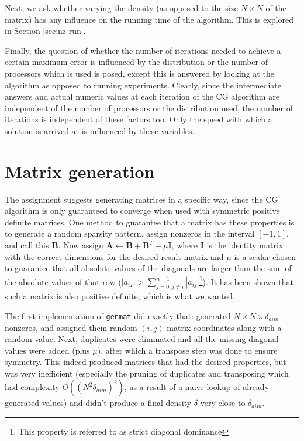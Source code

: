 \documentclass[a4paper]{article}
\newcommand{\mat}[1]{\ensuremath{\boldsymbol{#1}}}
\begin{document}
Next, we ask whether varying the density (as opposed to the size $N\times N$ of the matrix) has
any influence on the running time of the algorithm. This is explored in Section \ref{sec:nz-run}.

Finally, the question of whether the number of iterations needed to achieve a certain maximum
error is influenced by the distribution or the number of processors which is used is posed, except
this is answered by looking at the algorithm as opposed to running experiments. Clearly, since the
intermediate answers and actual numeric values at each iteration of the CG algorithm are independent
of the number of processors or the distribution used, the number of iterations is independent of these
factors too. Only the speed with which a solution is arrived at is influenced by these variables.

\section{Matrix generation}\label{sec:matrix-generation}

The assignment suggests generating matrices in a specific way, since the CG
algorithm is only guaranteed to converge when used with symmetric positive
definite matrices. One method to guarantee that a matrix has these properties
is to generate a random sparsity pattern, assign nonzeros in the interval
$[-1,1]$, and call this \mat B.  Now assign $\mat A \leftarrow \mat B + \mat
B^T + \mu \mat I$, where \mat I is the identity matrix with the correct
dimensions for the desired result matrix and $\mu$ is a scalar chosen to
guarantee that all absolute values of the diagonals are larger than the sum of
the absolute values of that row ($|a_{iI}| > \sum_{j=0,j\neq i}^{n-1}
|a_{ij}|$\footnote{This property is referred to as strict diagonal dominance}).
It has been shown that such a matrix is also positive definite, which is what
we wanted.

The first implementation of \texttt{genmat} did exactly that: generated $N\times N \times \delta_{aim}$
nonzeros, and assigned them random $(i,j)$ matrix coordinates along with a random value. Next, duplicates
were eliminated and all the missing diagonal values were added (plus $\mu$), after which a transpose step
was done to ensure symmetry. This indeed produced matrices that had the desired properties, but
was very inefficient (especially the pruning of duplicates and
transposing which had complexity $O( (N^2\delta_{aim})^2 )$, as a result of a naive lookup of already-generated values)
and didn't produce a final density $\delta$ very close to $\delta_{aim}$.
\end{document}
